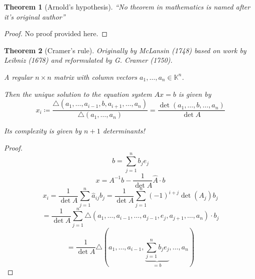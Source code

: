 \documentclass[a4paper,landscape,twocolumn]{article}
\newtheorem{theorem}{Theorem}
\begin{document}
\begin{theorem}[Arnold's hypothesis]
  \enquote{No theorem in mathematics is named after it's original author}
\end{theorem}
\begin{proof}
  No proof provided here.
\end{proof}

\begin{theorem}[Cramer's rule]
  Originally by McLansin (1748) based on work by Leibniz (1678) and reformulated by G. Cramer (1750).

  A regular $n\times n$ matrix with column vectors $a_1, \ldots, a_n \in \mathbb K^n$.

  Then the unique solution to the equation system $Ax = b$ is given by
  \[
    x_i \coloneqq
    \frac{\triangle(a_1, \ldots, a_{i-1}, b, a_{i+1}, \ldots, a_n)}{\triangle(a_1, \ldots, a_n)}
    = \frac{\det(a_1,\ldots,b,\ldots,a_n)}{\det{A}}
  \]

  Its complexity is given by $n+1$ determinants!
\end{theorem}
\begin{proof}
  \[ b = \sum_{j=1}^{n} b_j e_j \]
  \[ x = A^{-1} b - \frac{1}{\det{A}} \hat{A} \cdot b \]
  \[ x_i = \frac{1}{\det{A}} \sum_{j=1}^{n} \hat{a}_{ij} b_j = \frac{1}{\det{A}} \sum_{j=1}^{n} (-1)^{i+j} \det{(A_j)} b_j \]
  \[ = \frac{1}{\det{A}} \sum_{j=1}^n \triangle (a_1, \ldots, a_{i-1}, \ldots, a_{j-1}, e_j, a_{j+1}, \ldots, a_n) \cdot b_j \]
  \[ = \frac{1}{\det{A}} \triangle (a_1, \ldots, a_{i-1}, \underbrace{\sum_{j=1}^n b_j e_j}_{=b}, \ldots, a_n) \]
\end{proof}

\end{document}
